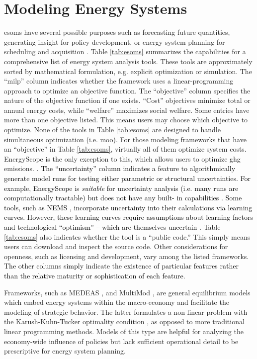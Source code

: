 \section{Modeling Energy Systems}

\Acp{esom} have several possible
purposes such as forecasting future quantities, generating insight for policy
development, or energy system planning for scheduling and acquisition
\cite{decarolis_using_2011, yue_review_2018}. Table \ref{tab:esoms} summarizes
the capabilities for a comprehensive list of energy system analysis tools. These
tools are approximately sorted by mathematical formulation, e.g. explicit
optimization or simulation. The ``\ac{milp}'' column indicates whether the
framework uses a linear-programming approach to optimize an objective function.
The ``objective'' column specifies the nature of the objective function if one
exists. ``Cost'' objectives minimize total or annual energy costs, while
``welfare'' maximizes social welfare. Some entries have more than one objective
listed. This means users may choose which objective to optimize. None of the
tools in Table \ref{tab:esoms} are designed to handle simultaneous optimization
(i.e. \ac{moo}). For those modeling frameworks that have an ``objective'' in
Table \ref{tab:esoms}, virtually all of them optimize system costs. EnergyScope
is the only exception to this, which allows users to optimize \ac{ghg}
emissions. \cite{limpens_energyscope_2019}. \textcolor{black}{The
``uncertainty'' column indicates a feature to algorithmically generate model
runs for testing either parametric or structural uncertainties.
\textcolor{black}{For example, EnergyScope is \textit{suitable} for uncertainty
analysis (i.e. many runs are computationally tractable) but does not have any
built- in capabilities \cite{limpens_energyscope_2019}.} Some tools, such as
NEMS \cite{nalley_national_2019}, incorporate uncertainty into their
calculations via learning curves. However, these learning curves require
assumptions about learning factors and technological ``optimism'' --  which are
themselves uncertain \cite{nalley_national_2019}.} Table \ref{tab:esoms} also
indicates whether the tool is a ``public code.'' This simply means users can
download and inspect the source code. Other considerations for openness, such as
licensing and development, vary among the listed frameworks.
\textcolor{black}{The other columns simply indicate the existence of particular
features rather than the relative maturity or sophistication of each feature.} 

Frameworks, such as MEDEAS \cite{capellan-perez_medeas_2020}, and MultiMod
\cite{huppmann_market_2014}, are general equilibrium models which embed energy
systems within the macro-economy and facilitate the modeling of strategic
behavior. The latter formulates a non-linear problem with the Karush-Kuhn-Tucker
optimality condition \cite{huppmann_market_2014}, as opposed to more traditional
linear programming methods. Models of this type are helpful for analyzing the
economy-wide influence of policies but lack sufficient operational detail to be
prescriptive for energy system planning.


